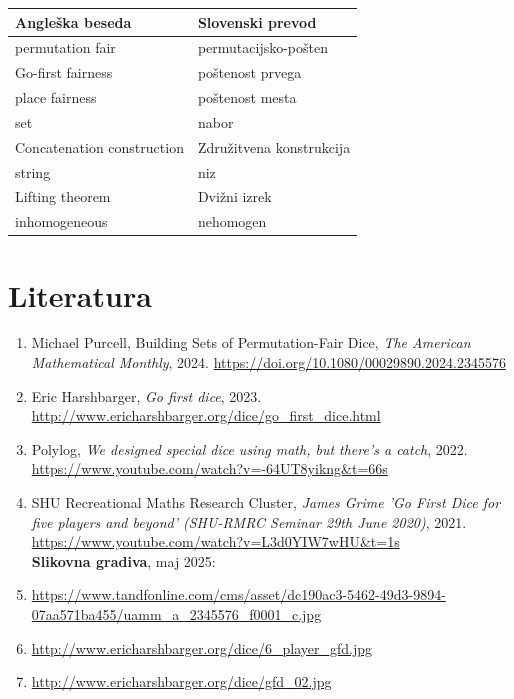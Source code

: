 \documentclass[a4paper, 12pt]{article}
\begin{document}
\begin{tabular}{|l|l|}
\hline
\textbf{Angleška beseda} & \textbf{Slovenski prevod} \\
\hline
\hline
permutation fair & permutacijsko-pošten \\
\hline
Go-first fairness & poštenost prvega \\
\hline
place fairness & poštenost mesta \\
\hline
set & nabor \\
\hline
Concatenation construction & Združitvena konstrukcija \\
\hline
string & niz \\
\hline
Lifting theorem & Dvižni izrek \\
\hline
inhomogeneous & nehomogen \\
\hline

\end{tabular}

\section*{Literatura}
\begin{enumerate}
  \item \label{purcell} Michael Purcell, Building Sets of Permutation-Fair Dice, \emph{The American Mathematical Monthly}, 2024. \url{https://doi.org/10.1080/00029890.2024.2345576}
  \item \label{harshbarger} Eric Harshbarger, \emph{Go first dice}, 2023. \url{http://www.ericharshbarger.org/dice/go_first_dice.html}
  \item \label{polylog} Polylog, \emph{We designed special dice using math, but there's a catch}, 2022. \url{https://www.youtube.com/watch?v=-64UT8yikng&t=66s}
  \item \label{SHU} SHU Recreational Maths Research Cluster, \emph{James Grime 'Go First Dice for five players and beyond' (SHU-RMRC Seminar 29th June 2020)}, 2021. \url{https://www.youtube.com/watch?v=L3d0YIW7wHU&t=1s}\\
  
  \textbf{Slikovna gradiva}, maj 2025:
  \item \url{https://www.tandfonline.com/cms/asset/dc190ac3-5462-49d3-9894-07aa571ba455/uamm_a_2345576_f0001_c.jpg}
  \item \url{http://www.ericharshbarger.org/dice/6_player_gfd.jpg}
  \item \url{http://www.ericharshbarger.org/dice/gfd_02.jpg}
\end{enumerate}
\end{document}

